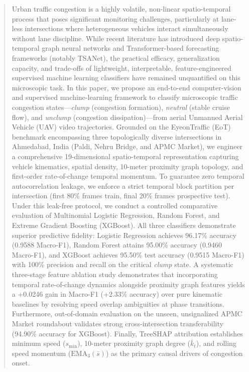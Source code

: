\documentclass[conference]{IEEEtran}
\begin{document}
\begin{abstract}
Urban traffic congestion is a highly volatile, non-linear spatio-temporal process that poses significant monitoring challenges, particularly at lane-less intersections where heterogeneous vehicles interact simultaneously without lane discipline. While recent literature has introduced deep spatio-temporal graph neural networks and Transformer-based forecasting frameworks (notably TSANet), the practical efficacy, generalization capacity, and trade-offs of lightweight, interpretable, feature-engineered supervised machine learning classifiers have remained unquantified on this microscopic task. In this paper, we propose an end-to-end computer-vision and supervised machine-learning framework to classify microscopic traffic congestion states---\textit{clump} (congestion formation), \textit{neutral} (stable cruise flow), and \textit{unclump} (congestion dissipation)---from aerial Unmanned Aerial Vehicle (UAV) video trajectories. Grounded on the EyeonTraffic (EoT) benchmark encompassing three topologically diverse intersections in Ahmedabad, India (Paldi, Nehru Bridge, and APMC Market), we engineer a comprehensive 19-dimensional spatio-temporal representation capturing vehicle kinematics, spatial density, 10-meter proximity graph topology, and first-order rate-of-change temporal momentum. To guarantee zero temporal autocorrelation leakage, we enforce a strict temporal block partition per intersection (first 80\% frames train, final 20\% frames prospective test). Under this leak-free protocol, we conduct a controlled comparative evaluation of Multinomial Logistic Regression, Random Forest, and Extreme Gradient Boosting (XGBoost). All three classifiers demonstrate superior predictive fidelity: Logistic Regression achieves 96.17\% accuracy (0.9588 Macro-F1), Random Forest attains 95.00\% accuracy (0.9460 Macro-F1), and XGBoost achieves 95.50\% test accuracy (0.9515 Macro-F1) with 100\% precision and recall on the critical \textit{clump} state. A systematic three-stage feature ablation study demonstrates that incorporating temporal rate-of-change dynamics alongside proximity graph features yields a +0.0246 gain in Macro-F1 (+2.33\% accuracy) over pure kinematic baselines by resolving speed overlap ambiguities at phase transitions. Furthermore, out-of-domain evaluation on the unseen, unsignalized APMC Market roundabout validates strong cross-intersection transferability (94.90\% accuracy for XGBoost). Finally, TreeSHAP attribution establishes minimum speed ($s_{\min}$), 10-meter proximity graph degree ($\bar{k}_t$), and rolling speed momentum ($\text{EMA}_3(\bar{s})$) as the primary causal drivers of congestion onset.
\end{abstract}
\end{document}
